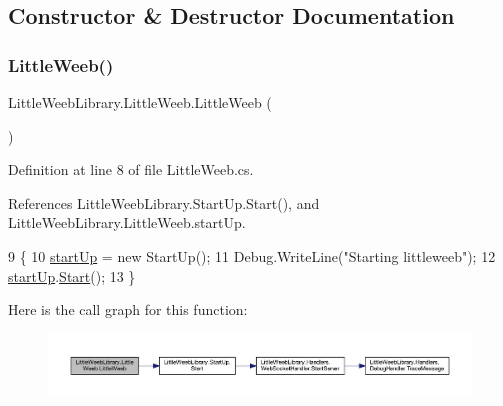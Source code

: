 \subsection{Constructor \& Destructor Documentation}
\mbox{\label{class_little_weeb_library_1_1_little_weeb_a15e3c466b1eccd90f03c3d2661dfbfd7}} 
\subsubsection{\texorpdfstring{Little\+Weeb()}{LittleWeeb()}}
{\footnotesize\ttfamily Little\+Weeb\+Library.\+Little\+Weeb.\+Little\+Weeb (\begin{DoxyParamCaption}{ }\end{DoxyParamCaption})}



Definition at line 8 of file Little\+Weeb.\+cs.



References Little\+Weeb\+Library.\+Start\+Up.\+Start(), and Little\+Weeb\+Library.\+Little\+Weeb.\+start\+Up.


\begin{DoxyCode}
9         \{
10             \mbox{\hyperlink{class_little_weeb_library_1_1_little_weeb_ad4c016487a2b4f445d12bd8dc0414675}{startUp}} = \textcolor{keyword}{new} StartUp();
11             Debug.WriteLine(\textcolor{stringliteral}{"Starting littleweeb"});
12             \mbox{\hyperlink{class_little_weeb_library_1_1_little_weeb_ad4c016487a2b4f445d12bd8dc0414675}{startUp}}.\mbox{\hyperlink{class_little_weeb_library_1_1_start_up_a2ea98092dfdb92bfc6decfdc373d6e78}{Start}}();
13         \}
\end{DoxyCode}
Here is the call graph for this function\+:\nopagebreak
\begin{figure}[H]
\begin{center}
\leavevmode
\includegraphics[width=350pt]{class_little_weeb_library_1_1_little_weeb_a15e3c466b1eccd90f03c3d2661dfbfd7_cgraph}
\end{center}
\end{figure}


